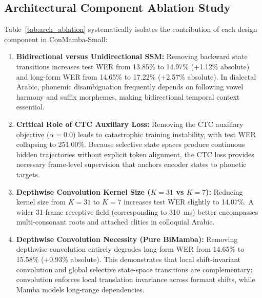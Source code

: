 \documentclass[journal]{IEEEtran}
\begin{document}
\subsection{Architectural Component Ablation Study}
\label{sec:arch_ablation}
Table~\ref{tab:arch_ablation} systematically isolates the contribution of each design component in ConMamba-Small:
\begin{enumerate}
    \item \textbf{Bidirectional versus Unidirectional SSM:} Removing backward state transitions increases test WER from 13.85\% to 14.97\% (+1.12\% absolute) and long-form WER from 14.65\% to 17.22\% (+2.57\% absolute). In dialectal Arabic, phonemic disambiguation frequently depends on following vowel harmony and suffix morphemes, making bidirectional temporal context essential.
    \item \textbf{Critical Role of CTC Auxiliary Loss:} Removing the CTC auxiliary objective ($\alpha = 0.0$) leads to catastrophic training instability, with test WER collapsing to 251.00\%. Because selective state spaces produce continuous hidden trajectories without explicit token alignment, the CTC loss provides necessary frame-level supervision that anchors encoder states to phonetic targets.
    \item \textbf{Depthwise Convolution Kernel Size ($K=31$ vs $K=7$):} Reducing kernel size from $K=31$ to $K=7$ increases test WER slightly to 14.07\%. A wider 31-frame receptive field (corresponding to 310~ms) better encompasses multi-consonant roots and attached clitics in colloquial Arabic.
    \item \textbf{Depthwise Convolution Necessity (Pure BiMamba):} Removing depthwise convolution entirely degrades long-form WER from 14.65\% to 15.58\% (+0.93\% absolute). This demonstrates that local shift-invariant convolution and global selective state-space transitions are complementary: convolution enforces local translation invariance across formant shifts, while Mamba models long-range dependencies.
\end{enumerate}
\end{document}
